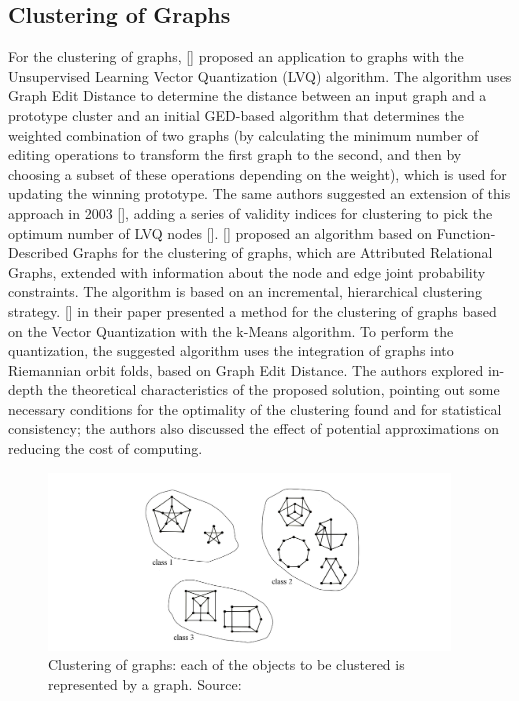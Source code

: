 \subsection{Clustering of Graphs}
For the clustering of graphs, [\cite{Gunter:2002}] proposed an application to graphs with the Unsupervised Learning Vector Quantization (LVQ) algorithm. The algorithm uses Graph Edit Distance to determine the distance between an input graph and a prototype cluster and an initial GED-based algorithm that determines the weighted combination of two graphs (by calculating the minimum number of editing operations to transform the first graph to the second, and then by choosing a subset of these operations depending on the weight), which is used for updating the winning prototype. The same authors suggested an extension of this approach in 2003 [\cite{Gunter:2003}], adding a series of validity indices for clustering to pick the optimum number of LVQ nodes [\cite{Foggia:2014}]. [\cite{Serratosa:2002}] proposed an algorithm based on Function-Described Graphs for the clustering of graphs, which are Attributed Relational Graphs, extended with information about the node and edge joint probability constraints. The algorithm is based on an incremental, hierarchical clustering strategy. [\cite{Brijnesh:2011}] in their paper presented a method for the clustering of graphs based on the Vector Quantization with the k-Means algorithm. To perform the quantization, the suggested algorithm uses the integration of graphs into Riemannian orbit folds, based on Graph Edit Distance. The authors explored in-depth the theoretical characteristics of the proposed solution, pointing out some necessary conditions for the optimality of the clustering found and for statistical consistency; the authors also discussed the effect of potential approximations on reducing the cost of computing.

\begin{figure}[!ht]
\centering
\includegraphics[width=0.95\textwidth,center]{picture/figure6.png}
\caption[Clustering of Graphs]{Clustering of graphs: each of the objects to be clustered is represented by a graph. Source: \cite{Foggia:2014}}
\label{fig:clusteringgraphs}
\end{figure}


